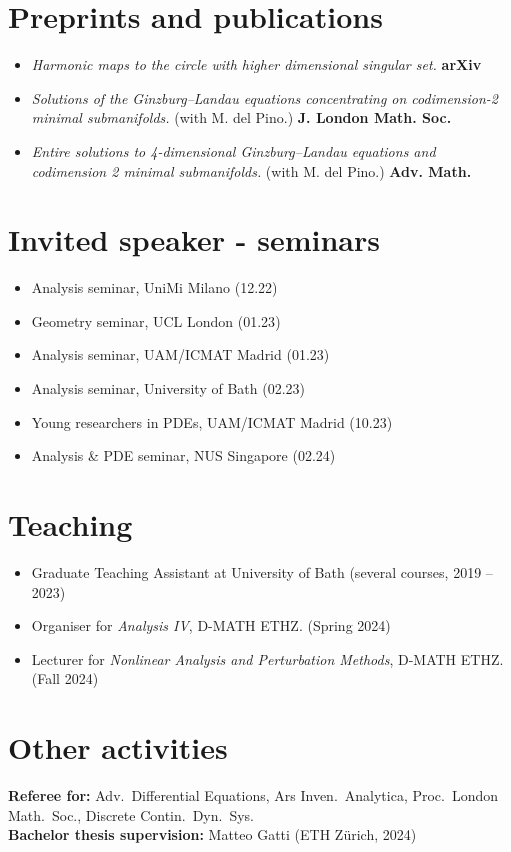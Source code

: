 \documentclass[a4paper,11pt]{article}
\begin{document}
\section*{Preprints and publications}
\noindent
\begin{itemize}
	\item \emph{Harmonic maps to the circle with higher dimensional singular set.} {\bf arXiv}
	\item \emph{Solutions of the Ginzburg--Landau equations concentrating on codimension-2 minimal submanifolds.} (with M. del Pino.) {\bf J. London Math. Soc.}
	\item \emph{Entire solutions to 4-dimensional Ginzburg--Landau equations and codimension 2 minimal submanifolds.} (with M. del Pino.) {\bf Adv. Math.}
\end{itemize}

\vspace{5mm}

\section*{Invited speaker - seminars}
\noindent
\begin{itemize}
	\item Analysis seminar, UniMi Milano ({12.22})
	\item Geometry seminar, UCL London ({01.23})
	\item Analysis seminar,  UAM/ICMAT Madrid (01.23)
	\item Analysis seminar, University of Bath (02.23)
	\item Young researchers in PDEs, UAM/ICMAT Madrid (10.23)
	\item Analysis \& PDE seminar, NUS Singapore (02.24)
\end{itemize}
\vspace{5mm}

\section*{Teaching}
\noindent
\begin{itemize}
	\item Graduate Teaching Assistant at University of Bath (several courses, 2019 -- 2023)
	\item Organiser for \emph{Analysis IV}, D-MATH ETHZ. (Spring 2024)
	\item Lecturer for \emph{Nonlinear Analysis and Perturbation Methods}, D-MATH ETHZ. (Fall 2024)
\end{itemize}
\vspace{5mm}

\section*{Other activities}
\noindent
\textbf{Referee for:} Adv.\ Differential Equations, Ars Inven.\ Analytica, Proc.\ London Math.\ Soc., Discrete Contin.\ Dyn.\ Sys.\\
 
\noindent
\textbf{Bachelor thesis supervision:} Matteo Gatti (ETH Z\"urich, 2024)
\vspace{5mm}
\end{document}

